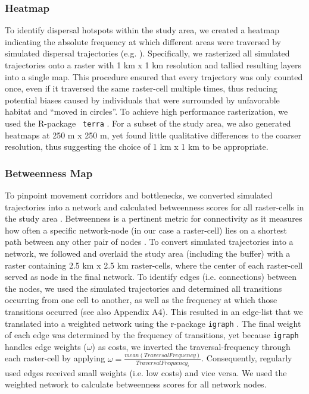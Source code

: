 \documentclass[abstract=on,10pt,a4paper,bibliography=totocnumbered]{article}
\begin{document}
\subsubsection{Heatmap}
To identify dispersal hotspots within the study area, we created a heatmap
indicating the absolute frequency at which different areas were traversed by
simulated dispersal trajectories (e.g. \citealp{Hauenstein.2019, Zeller.2020}).
Specifically, we rasterized all simulated trajectories onto a raster with 1 km x
1 km resolution and tallied resulting layers into a single map. This procedure
ensured that every trajectory was only counted once, even if it traversed the
same raster-cell multiple times, thus reducing potential biases caused by
individuals that were surrounded by unfavorable habitat and ``moved in
circles''. To achieve high performance rasterization, we used the R-package {\tt
terra} \citep{Hijmans.2021b}. For a subset of the study area, we also generated
heatmaps at 250 m x 250 m, yet found little qualitative differences to the
coarser resolution, thus suggesting the choice of 1 km x 1 km to be appropriate.

\subsubsection{Betweenness Map}
To pinpoint movement corridors and bottlenecks, we converted simulated
trajectories into a network and calculated betweenness scores for all
raster-cells in the study area \citep{BastilleRousseau.2018}. Betweenness is a
pertinent metric for connectivity as it measures how often a specific
network-node (in our case a raster-cell) lies on a shortest path between any
other pair of nodes \citep{BastilleRousseau.2018}. To convert simulated
trajectories into a network, we followed \cite{BastilleRousseau.2018} and
overlaid the study area (including the buffer) with a raster containing 2.5 km x
2.5 km raster-cells, where the center of each raster-cell served as node in the
final network. To identify edges (i.e. connections) between the nodes, we used
the simulated trajectories and determined all transitions occurring from one
cell to another, as well as the frequency at which those transitions occurred
(see also Appendix A4). This resulted in an edge-list that we translated into a
weighted network using the r-package {\tt igraph} \citep{Gabor.2006}. The final
weight of each edge was determined by the frequency of transitions, yet because
{\tt igraph} handles edge weights (\(\omega\)) as costs, we inverted the
traversal-frequency through each raster-cell by applying \(\omega =
\frac{mean(Traversal Frequency)}{Traversal Frequency_i}\). Consequently,
regularly used edges received small weights (i.e. low costs) and vice versa. We
used the weighted network to calculate betweenness scores for all network nodes.
\end{document}
